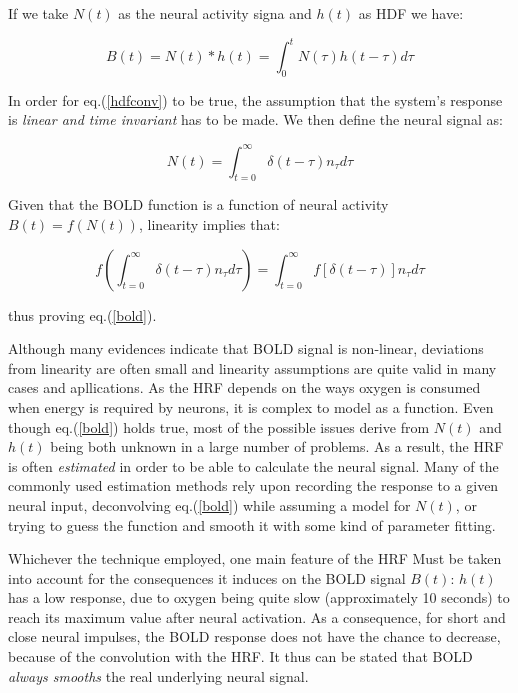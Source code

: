 \documentclass[12pt,openright,twoside,a4paper]{book}
\begin{document}
If we take $N(t)$ as the neural activity signa and $h(t)$ as HDF we have:

\begin{equation}
B(t)=N(t)\ast h(t)=\int_0^t N(\tau)h(t-\tau)d\tau
\label{hdfconv}
\end{equation}

In order for eq.(\ref{hdfconv}) to be true, the assumption that the system's response is \textit{linear and time invariant} has to be made. We then define the neural signal as:

\begin{equation}
N(t)=\int_{t=0}^\infty \delta(t-\tau)n_{\tau}d\tau
\end{equation}

Given that the BOLD function is a function of neural activity $B(t) = f(N(t))$, linearity
implies that: 

\begin{equation}
f(\int_{t=0}^\infty \delta(t-\tau)n_{\tau}d\tau)=\int_{t=0}^\infty f[\delta(t-\tau)]n_{\tau}d\tau
\end{equation}

thus proving eq.(\ref{bold}).
\vspace{5mm}

Although many evidences indicate that BOLD signal is non-linear, deviations from linearity are often small and linearity assumptions are quite valid in many cases and apllications.
As the HRF depends on the ways oxygen is consumed when energy is required by neurons, it is complex to model as a function.
Even though eq.(\ref{bold}) holds true, most of the possible issues derive from $N(t)$ and $h(t)$ being both unknown in a large number of problems.
As a result, the HRF is often \textit{estimated} in order to be able to calculate the neural signal.
Many of the commonly used estimation methods rely upon recording the response to a given neural input, deconvolving eq.(\ref{bold}) while assuming a model for $N(t)$, or trying to guess the function and smooth it with some kind of parameter fitting.

Whichever the technique employed, one main feature of the HRF Must be taken into account for the consequences it induces on the BOLD signal $B(t)$: $h(t)$ has a low response, due to oxygen being quite slow (approximately 10 seconds) to reach its maximum value after neural activation.
As a consequence, for short and close neural impulses, the BOLD response does not have the chance to decrease, because of the convolution with the HRF. 
It thus can be stated that BOLD \textit{always smooths} the real underlying neural signal.
\end{document}

